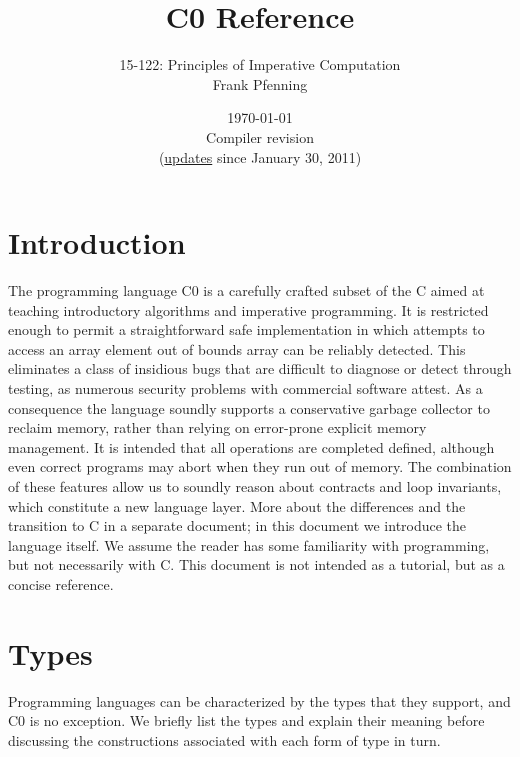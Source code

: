 \documentclass[11pt]{article}
\title{C0 Reference}
\author{15-122: Principles of Imperative Computation \\ Frank Pfenning}
\date{\today\\Compiler revision \rev\\
  (\hyperlink{sec:updates}{updates} since January 30, 2011)}
\begin{document}
\maketitle

\tableofcontents

\clearpage

\section{Introduction}

The programming language C0 is a carefully crafted subset of the C
aimed at teaching introductory algorithms and imperative programming.
It is restricted enough to permit a straightforward safe
implementation in which attempts to access an array element out of
bounds array can be reliably detected.  This eliminates a class of
insidious bugs that are difficult to diagnose or detect through
testing, as numerous security problems with commercial software
attest.  As a consequence the language soundly supports a conservative
garbage collector to reclaim memory, rather than relying on
error-prone explicit memory management.  It is intended that all
operations are completed defined, although even correct programs may
abort when they run out of memory.  The combination of these features
allow us to soundly reason about contracts and loop invariants, which
constitute a new language layer.  More about the differences and the
transition to C in a separate document; in this document we introduce
the language itself.  We assume the reader has some familiarity with
programming, but not necessarily with C\@.  This document is not intended
as a tutorial, but as a concise reference.

\section{Types}

Programming languages can be characterized by the types that they support,
and C0 is no exception.  We briefly list the types and explain their
meaning before discussing the constructions associated with each
form of type in turn.
\end{document}

